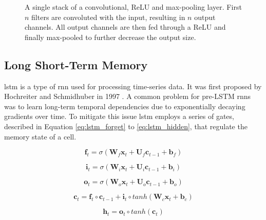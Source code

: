 \begin{figure}[!h]
    \centering
    
    \caption[Convolution, ReLU and max-pool overview]{A single stack of a convolutional, ReLU and max-pooling layer. First $n$ filters are convoluted with the input, resulting in $n$ output channels. All output channels are then fed through a ReLU and finally max-pooled to further decrease the output size.}
    \label{fig:cnn}
\end{figure}

\subsection{Long Short-Term Memory}\label{subsec:lstm}

\gls{lstm} is a type of \gls{rnn} used for processing time-series data. It was first proposed by Hochreiter and Schmidhuber in 1997 \cite{hochreiter1997lstm}. A common problem for pre-LSTM \glspl{rnn} was to learn long-term temporal dependencies due to exponentially decaying gradients over time. To mitigate this issue \gls{lstm} employs a series of gates, described in Equation \ref{eq:lstm_forget} to \ref{eq:lstm_hidden}, that regulate the memory state of a cell.

\begin{equation}
   \mathbf{f}_t = \sigma (\mathbf{W}_f \mathbf{x}_t + \mathbf{U}_f \mathbf{c}_{t-1} + \mathbf{b}_f)
   \label{eq:lstm_forget}
\end{equation}

\begin{equation}
   \mathbf{i}_t = \sigma (\mathbf{W}_i \mathbf{x}_t + \mathbf{U}_i \mathbf{c}_{t-1} + \mathbf{b}_i)
   \label{eq:lstm_input}
\end{equation}

\begin{equation}
   \mathbf{o}_t = \sigma (\mathbf{W}_o \mathbf{x}_t + \mathbf{U}_o \mathbf{c}_{t-1} + \mathbf{b}_o)
   \label{eq:lstm_output}
\end{equation}

\begin{equation}
   \mathbf{c}_t = \mathbf{f}_t \circ \mathbf{c}_{t-1} + \mathbf{i}_t \circ tanh (\mathbf{W}_c \mathbf{x}_t + \mathbf{b}_c)
   \label{eq:lstm_context}
\end{equation}

\begin{equation}
   \mathbf{h}_t = \mathbf{o}_t \circ tanh (\mathbf{c}_t)
   \label{eq:lstm_hidden}
\end{equation}


